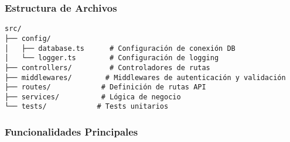 \documentclass[12pt,a4paper]{article}
\begin{document}
\subsubsection{Estructura de Archivos}
\begin{verbatim}
src/
├── config/
│   ├── database.ts      # Configuración de conexión DB
│   └── logger.ts        # Configuración de logging
├── controllers/         # Controladores de rutas
├── middlewares/        # Middlewares de autenticación y validación
├── routes/            # Definición de rutas API
├── services/          # Lógica de negocio
└── tests/            # Tests unitarios
\end{verbatim}

\subsubsection{Funcionalidades Principales}
\end{document}
